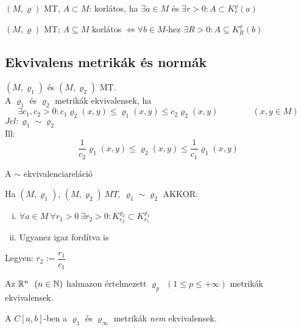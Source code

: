 \begin{de}
  $(M, \varrho)$ MT, $A\subset M$: korlátos, ha
  $\exists a \in M$ és $\exists r > 0: A\subset K_r^\varrho (a)$
\end{de}

\begin{te}
  $(M, \varrho)$ MT; $A\subseteq M$ korlátos $\Leftrightarrow
  \forall b \in M$-hez $\exists R>0\colon A\subseteq K_R^\varrho (b)
  $
\end{te}


\subsection{Ekvivalens metrikák és normák}

\begin{de}
  $(M,\varrho_1)$ és $(M,\varrho_2)$ MT.\\
  A $\varrho_1$ és $\varrho_2$ metrikák ekvivalensek, ha
  \[\exists c_1,c_2>0\colon
  c_1\varrho_2(x,y)\leq \varrho_1(x,y)\leq c_2\varrho_2(x,y)\qquad\qquad(x,y\in M)\]
  $Jel: \varrho_1\sim\varrho_2$\\Ill:
  \[\dfrac1{c_2}\varrho_1(x,y)\leq\varrho_2(x,y)\leq \dfrac1{c_1}\varrho_1(x,y)\]
\end{de}

\begin{te}
  A $\sim$ ekvivalenciareláció
\end{te}

\begin{te}
  Ha $(M, \varrho_1),\,(M, \varrho_2)\ MT,\ \varrho_1\sim\varrho_2$
  AKKOR:  \begin{enumerate}[i)]
  \item $\forall a \in M\  \forall r_1>0\  \exists r_2>0\colon
    K_{r_2}^{\varrho_2}\subset K_{r_1}^{\varrho_1}$
  \item Ugyanez igaz fordítva is
  \end{enumerate}
\end{te}
\begin{biz}
  Legyen: $r_2:=\dfrac{r_1}{c_1}$
\end{biz}

\begin{te}
  Az $\mathbb{R}^n\ \ (n\in\mathbb{N})$ halmazon értelmezett $\varrho_p\ \ (1\leq
  p\leq+\infty)$ metrikák ekvivalensek.
\end{te}

\begin{te}
  A $C[a,b]$-ben a $\varrho_1$ és $\varrho_\infty$ metrikák
  \emph{nem} ekvivalensek.   
\end{te}

